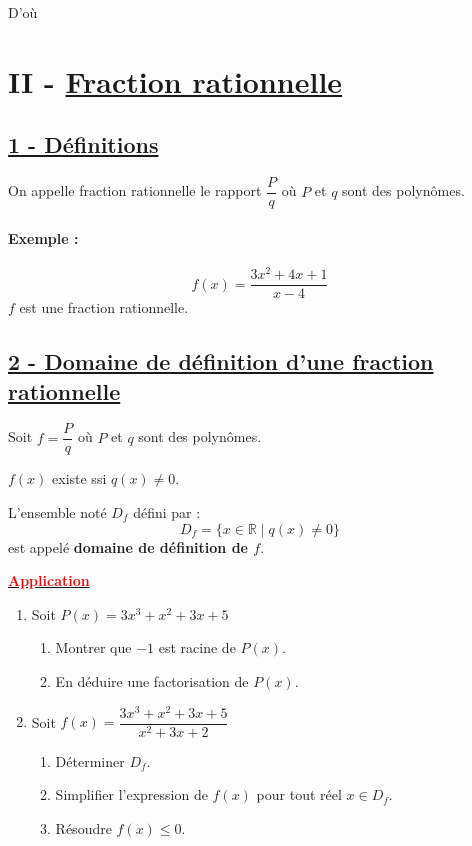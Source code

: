 \documentclass[12pt,a4paper]{article}
\begin{document}
\vspace{1em}

\noindent D'où 

\section*{%
    \color{red}II - \underline{ Fraction rationnelle}%
}

\subsection*{%
    \color{red} \underline{1 - Définitions}%
}
On appelle fraction rationnelle le rapport $\dfrac{P}{q}$ où $P$ et $q$ sont des polynômes.

\paragraph{Exemple :}
\[ f(x) = \frac{3x^2 + 4x + 1}{x - 4} \]
$f$ est une fraction rationnelle.

\subsection*{%
    \color{red} \underline{2 - Domaine de définition d'une fraction rationnelle}%
}
Soit $f = \dfrac{P}{q}$ où $P$ et $q$ sont des polynômes.

\vspace{1em}

$f(x)$ existe ssi $q(x) \neq 0$.

L'ensemble noté $D_f$ défini par :
\[ D_f = \{x \in \mathbb{R} \mid q(x) \neq 0\} \]
est appelé \textbf{domaine de définition de $f$}.

\begin{center}
    \textbf{\underline{\textcolor{red}{Application}}}
\end{center}

\begin{enumerate}
    \item Soit $P(x) = 3x^3 + x^2 + 3x + 5$
    \begin{enumerate}
        \item Montrer que $-1$ est racine de $P(x)$.
        \item En déduire une factorisation de $P(x)$.
    \end{enumerate}
    
    \item Soit $f(x) = \dfrac{3x^3 + x^2 + 3x + 5}{x^2 + 3x + 2}$
    \begin{enumerate}
        \item Déterminer $D_f$.
        \item Simplifier l'expression de $f(x)$ pour tout réel $x \in D_f$.
        \item Résoudre $f(x) \le 0$.
    \end{enumerate}
\end{enumerate}
\end{document}
